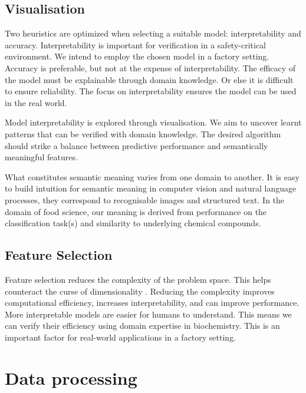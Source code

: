 \documentclass[runningheads]{llncs}
\begin{document}
\subsection{Visualisation}
\label{sec:background-visualisation}

Two heuristics are optimized when selecting a suitable model: interpretability and accuracy. 
Interpretability is important for verification in a safety-critical environment.
We intend to employ the chosen model in a factory setting.
Accuracy is preferable, but not at the expense of interpretability.
The efficacy of the model must be explainable through domain knowledge.
Or else it is difficult to ensure reliability.
The focus on interpretability ensures the model can be used in the real world.

Model interpretability is explored through visualisation.
We aim to uncover learnt patterns that can be verified with domain knowledge.
The desired algorithm should strike a balance between predictive performance and semantically meaningful features.

What constitutes semantic meaning varies from one domain to another.
It is easy to build intuition for semantic meaning in computer vision and natural language processes, they correspond to recognisable images and structured text.
In the domain of food science, our meaning is derived from performance on the classification task(s) and similarity to underlying chemical compounds.

\subsection{Feature Selection}
\label{sec:background-feature-selection}

Feature selection reduces the complexity of the problem space.
This helps counteract the curse of dimensionality \cite{koppen2000curse}.
Reducing the complexity improves computational efficiency, increases interpretability, and can improve performance.
More interpretable models are easier for humans to understand.
This means we can verify their efficiency using domain expertise in biochemistry.
This is an important factor for real-world applications in a factory setting.

\section{Data processing}

\end{document}
